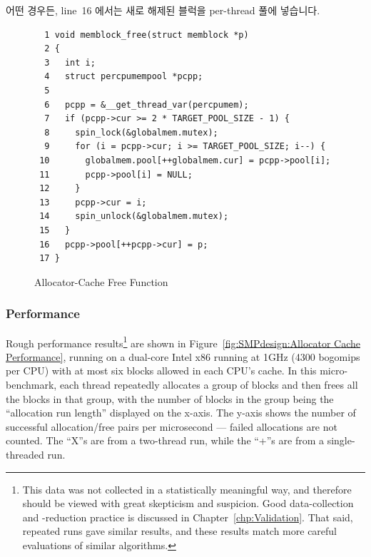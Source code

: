 어떤 경우든, line~16 에서는 새로 해제된 블럭을 per-thread 풀에 넣습니다.

\begin{figure}[htbp]
{ \scriptsize
\begin{verbatim}
  1 void memblock_free(struct memblock *p)
  2 {
  3   int i;
  4   struct percpumempool *pcpp;
  5
  6   pcpp = &__get_thread_var(percpumem);
  7   if (pcpp->cur >= 2 * TARGET_POOL_SIZE - 1) {
  8     spin_lock(&globalmem.mutex);
  9     for (i = pcpp->cur; i >= TARGET_POOL_SIZE; i--) {
 10       globalmem.pool[++globalmem.cur] = pcpp->pool[i];
 11       pcpp->pool[i] = NULL;
 12     }
 13     pcpp->cur = i;
 14     spin_unlock(&globalmem.mutex);
 15   }
 16   pcpp->pool[++pcpp->cur] = p;
 17 }
\end{verbatim}
}
\caption{Allocator-Cache Free Function}
\label{fig:SMPdesign:Allocator-Cache Free Function}
\end{figure}

\subsubsection{Performance}

Rough performance results\footnote{
	This data was not collected in a statistically meaningful way,
	and therefore should be viewed with great skepticism and suspicion.
	Good data-collection and -reduction practice is discussed
	in Chapter~\ref{chp:Validation}.
	That said, repeated runs gave similar results, and these results
	match more careful evaluations of similar algorithms.}
are shown in
Figure~\ref{fig:SMPdesign:Allocator Cache Performance},
running on a dual-core Intel x86 running at 1GHz (4300 bogomips per CPU)
with at most six blocks allowed in each CPU's cache.
In this micro-benchmark,
each thread repeatedly allocates a group of blocks and then frees all
the blocks in that group, with
the number of blocks in the group being the ``allocation run length''
displayed on the x-axis.
The y-axis shows the number of successful allocation/free pairs per
microsecond --- failed allocations are not counted.
The ``X''s are from a two-thread run, while the ``+''s are from a
single-threaded run.

